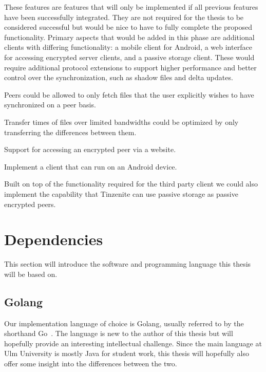 These features are features that will only be implemented if all previous features have been successfully integrated.
They are not required for the thesis to be considered successful but would be nice to have to fully complete the proposed functionality.
Primary aspects that would be added in this phase are additional clients with differing functionality: a mobile client for Android, a web interface for accessing encrypted server clients, and a passive storage client.
These would require additional protocol extensions to support higher performance and better control over the synchronization, such as shadow files and delta updates.

\begin{description}[leftmargin=7.5em,style=nextline,noitemsep,nolistsep]
\item[Shadow Files]
    Peers could be allowed to only fetch files that the user explicitly wishes to have synchronized on a peer basis.
\item[Delta Updates]
    Transfer times of files over limited bandwidths could be optimized by only transferring the differences between them.
\item[Web Interface]
    Support for accessing an encrypted peer via a website.
\item[Mobile Client]
    Implement a client that can run on an Android device.
\item[Passive Peer]
    Built on top of the functionality required for the third party client we could also implement the capability that Tinzenite can use passive storage as passive encrypted peers.
\end{description}

\section{Dependencies}
\label{sec:Dependencies}

This section will introduce the software and programming language this thesis will be based on.

\subsection{Golang}
\label{sub:Golang}

Our implementation language of choice is Golang, usually referred to by the shorthand Go~\cite{web:site:golang}.
The language is new to the author of this thesis but will hopefully provide an interesting intellectual challenge.
Since the main language at Ulm University is mostly Java for student work, this thesis will hopefully also offer some insight into the differences between the two.

